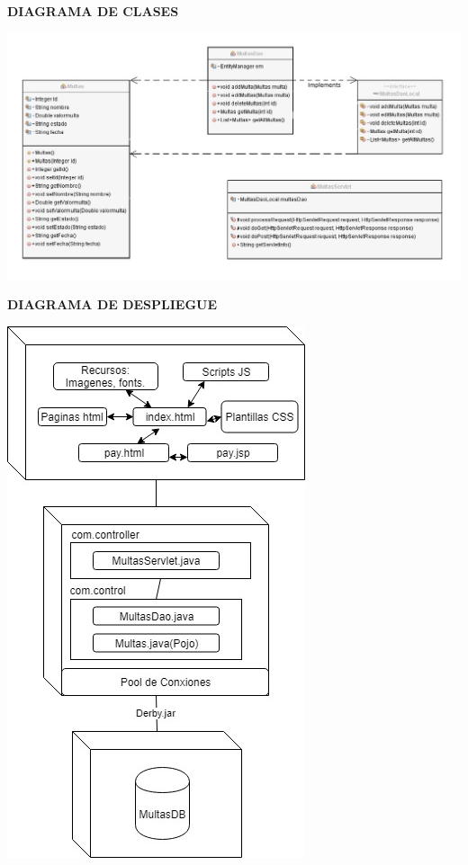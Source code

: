 \documentclass[12pt]{article}
\begin{document}
{\begin{center}
\textbf{\Large DIAGRAMA DE CLASES\\}
\end{center}
\begin{center}
\includegraphics[scale=0.5]{DIAGRAMcLASES.jpg}  
\end{center}

\begin{center}
\textbf{\Large DIAGRAMA DE DESPLIEGUE\\}
\end{center}
\begin{center}
\includegraphics[scale=0.8]{DIAGRAMdES.jpg} 
\end{center}
}
\thispagestyle{empty}
$ $
\end{document}
